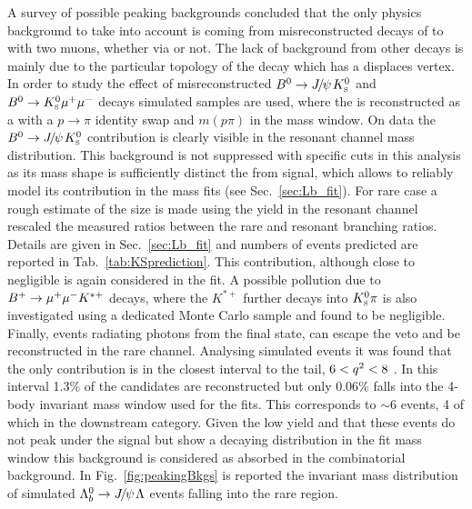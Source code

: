 A survey of possible peaking backgrounds concluded that the only physics background
to take into account is coming from misreconstructed decays of \Bz to \KS with
two muons, whether via \jpsi or not. The lack of background from other decays is
mainly due to the particular topology of the \Lz decay which has a displaces vertex.
In order to study the effect of misreconstructed $\Bz\ra\jpsi\KS$ and ${{B}^0}\rightarrow{\ensuremath{{K}^0_{\rm\scriptscriptstyle S}}}{\ensuremath{\mu^+\mu^-}}$ decays
simulated samples are used, where the \KS is reconstructed as a \Lz with a $p\rightarrow \pi$ identity
swap and $m(p\pi)$ in the \Lz mass window.
On data the $\Bz\ra\jpsi\KS$ contribution is clearly visible in the resonant channel mass distribution.
This background is not suppressed with specific cuts in this analysis as its mass shape is sufficiently distinct
the from \Lb signal, which allows to reliably model its contribution in the mass fits (see Sec.~\ref{sec:Lb_fit}).
For rare case a rough estimate of the size is made using the yield in the resonant channel
rescaled the measured ratios between the rare and resonant branching ratios.
Details are given in Sec.~\ref{sec:Lb_fit} and numbers of events predicted are reported in Tab.~\ref{tab:KSprediction}.
This contribution, although close to negligible is again considered in the fit.
A possible pollution due to $B^{+} \rightarrow{\ensuremath{\mu^+\mu^-}} K^{*+}$ decays, where the $K^{*+}$
further decays into $\KS\pi$ is also investigated using a dedicated Monte Carlo sample and found to be negligible.
Finally, \Lb\ra\jpsi\Lz events radiating photons from the final state, can escape the \jpsi veto
and be reconstructed in the rare channel. Analysing simulated events it was found that the only
contribution is in the closest \qsq interval to the \jpsi tail, $6 < {q^2} < 8$ \gevgevcccc.
In this interval 1.3\% of the \Lb\to\jpsi\Lz candidates are reconstructed but only 0.06\%
falls into the 4-body invariant mass window used for the fits. This corresponds to $\sim 6$
events, 4 of which in the downstream category. Given the low yield and that these events do
not peak under the signal but show a decaying distribution in the fit mass window this
background is considered as absorbed in the combinatorial background.
In Fig.~\ref{fig:peakingBkgs} is reported the invariant mass distribution of simulated $\Lb\ra\jpsi\Lz$
events falling into the rare \qsq region.
%
